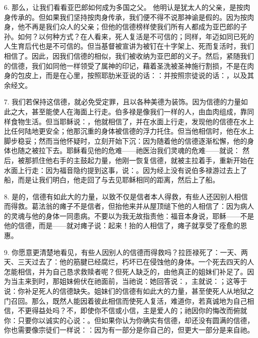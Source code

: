 6. 那么，让我们看看亚巴郎如何成为多国之父。 他明认是犹太人的父亲，是按肉身传承的。但如果我们坚持按肉身传承，我们便不得不说那神谕是假的。因为按肉身，他不再是我们众人的父亲；但他的信德榜样使我们所有人都成为亚巴郎的子孙。如何？以何种方式？在人看来，死人复活是不可信的；同样，年迈如同已死的人生育后代也是不可信的。但当基督被宣讲为被钉在十字架上、死而复活时，我们相信了。因此，因我们信德的相似，我们被收纳为亚巴郎的义子。然后，紧随我们的信德，我们如同他一样领受了属神的印记，藉着圣洗被圣神施行割损，不是在肉身的包皮上，而是在心里，按照耶肋米亚说的话：：并按照宗徒说的话：，以及其余经文。\par

7. 我们若保持这信德，就必免受定罪，且以各种美德为装饰。因为信德的力量如此之大，甚至能使人在海面上行走。伯多禄是像我们一样的人，由血肉组成，靠同样食物生活。但当耶稣说：，他就相信了，并在水面上行走，发现他的信德在水上比任何陆地更安全；他那沉重的身体被信德的浮力托住。但当他相信时，他在水上脚步稳妥；然而当他怀疑时，立刻开始下沉：因为随着他的信德逐渐松懈，他的身体也随之被拉下去。耶稣看见他的危难——祂医治我们灵魂的危难——就说： 然后，被那抓住他右手的主鼓起力量，他刚一恢复信德，就被主拉着手，重新开始在水面上行走：因为福音隐约提到这事，说：。因为经上没有说伯多禄游过去上了船，而是让我们明白，他走回了与去见耶稣相同的距离，然后上了船。\par

8. 是的，信德有如此大的力量，以致不仅是信者本人得救，有些人还因别人相信而得救。葛法翁的瘫子不是信者，但抬他来并从屋顶缒下他的人相信了：因为病人的灵魂与他的身体一同患病。不要以为我无故指责他：福音本身说，耶稣——不是他的信德，而是——就对瘫子说：起来！抬的人相信了，瘫子就享受了痊愈的恩惠。\par

9. 你愿意更清楚地看见，有些人因别人的信德而得救吗？拉匝禄死了：一天、两天、三天过去了：他的筋腱已经腐烂，朽坏已在侵蚀他的身体。一个死去四天的人怎能相信，并为自己恳求救赎者呢？但死人缺乏的，由他真正的姐妹们补足了。因为当主来到时，那姐妹俯伏在祂面前，当祂说：她回答说：，主就说：；这等于说：你补足死人的信德缺失。姐妹们的信德有如此大的力量，甚至使死人从地狱之门召回。那么，既然人能因着彼此相信而使死人复活，难道你，若真诚地为自己相信，不更得益处吗？不，即使你不信或小信，主是爱人的；祂因你的悔改而俯就你：只要你以诚实的心说：。但如果你认为你确实有信德，却还没有圆满的信德，你也需要像宗徒们一样说：：因为有一部分是你自己的，但更大一部分是来自祂。\par

